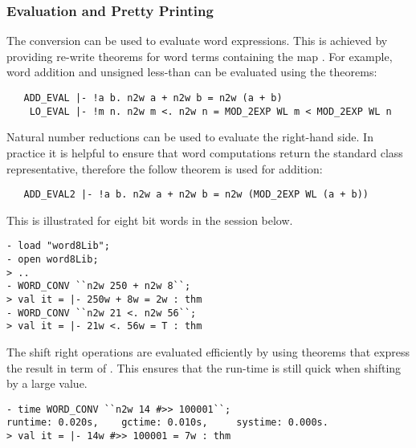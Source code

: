 {\subsubsection{Evaluation and Pretty Printing} \label{eval}

The conversion  can be used to evaluate word
expressions.  This is achieved by providing re-write theorems for word
terms containing the map .  For example, word addition and
unsigned less-than can be evaluated using the theorems:

\begin{hol}
\begin{verbatim}
   ADD_EVAL |- !a b. n2w a + n2w b = n2w (a + b)
    LO_EVAL |- !m n. n2w m <. n2w n = MOD_2EXP WL m < MOD_2EXP WL n
\end{verbatim}
\end{hol}

\noindent Natural number reductions can be used to evaluate the right-hand side.  In practice it is helpful to ensure that word computations return the standard class representative, therefore the follow theorem is used for addition:

\begin{hol}
\begin{verbatim}
   ADD_EVAL2 |- !a b. n2w a + n2w b = n2w (MOD_2EXP WL (a + b))
\end{verbatim}
\end{hol}

\noindent This is illustrated for eight bit words in the session below.

\setcounter{sessioncount}{0}
\begin{session}
\begin{verbatim}
- load "word8Lib";
- open word8Lib;
> ..
- WORD_CONV ``n2w 250 + n2w 8``;
> val it = |- 250w + 8w = 2w : thm
- WORD_CONV ``n2w 21 <. n2w 56``;
> val it = |- 21w <. 56w = T : thm
\end{verbatim}
\end{session}

The shift right operations are evaluated efficiently by using theorems
that express the result in term of .  This ensures that the
run-time is still quick when shifting by a large value.

\begin{session}
\begin{verbatim}
- time WORD_CONV ``n2w 14 #>> 100001``;
runtime: 0.020s,    gctime: 0.010s,     systime: 0.000s.
> val it = |- 14w #>> 100001 = 7w : thm
\end{verbatim}
\end{session}

}
